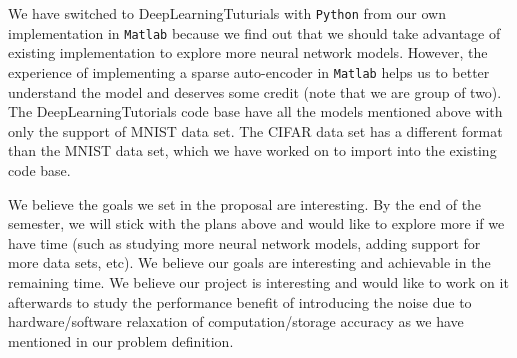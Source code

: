 We have switched to DeepLearningTuturials with {\tt Python} from our own
implementation in {\tt Matlab} because we find out that we should take advantage
of existing implementation to explore more neural network models. However, the
experience of implementing a sparse auto-encoder in {\tt Matlab} helps us to
better understand the model and deserves some credit (note that we are group of
two). The DeepLearningTutorials code base have all the models mentioned above
with only the support of MNIST data set. The CIFAR data set has a different
format than the MNIST data set, which we have worked on to import into the
existing code base.

We believe the goals we set in the proposal are interesting. By the end of the
semester, we will stick with the plans above and would like to explore more if
we have time (such as studying more neural network models, adding support for
more data sets, etc). We believe our goals are interesting and achievable in the
remaining time. We believe our project is interesting and would like to work on
it afterwards to study the performance benefit of introducing the noise due to
hardware/software relaxation of computation/storage accuracy as we have
mentioned in our problem definition.


